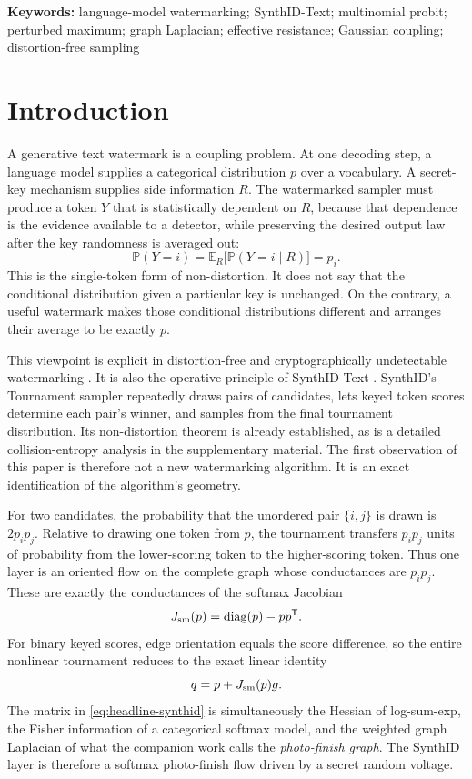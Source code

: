 \documentclass[11pt]{article}
\theoremstyle{definition}
\theoremstyle{remark}
\DeclareMathOperator{\diag}{diag}
\newcommand{\E}{\mathbb{E}}
\newcommand{\Pp}{\mathbb{P}}
\newcommand{\trans}{\mathsf{T}}
\begin{document}
\noindent\textbf{Keywords:} language-model watermarking; SynthID-Text; multinomial probit; perturbed maximum; graph Laplacian; effective resistance; Gaussian coupling; distortion-free sampling

\section{Introduction}

A generative text watermark is a coupling problem. At one decoding step, a language model supplies a categorical distribution $p$ over a vocabulary. A secret-key mechanism supplies side information $R$. The watermarked sampler must produce a token $Y$ that is statistically dependent on $R$, because that dependence is the evidence available to a detector, while preserving the desired output law after the key randomness is averaged out:
\begin{equation}
  \Pp(Y=i)=\E_R\big[\Pp(Y=i\mid R)\big]=p_i.
  \label{eq:nondist-intro}
\end{equation}
This is the single-token form of non-distortion. It does not say that the conditional distribution given a particular key is unchanged. On the contrary, a useful watermark makes those conditional distributions different and arranges their average to be exactly $p$.

This viewpoint is explicit in distortion-free and cryptographically undetectable watermarking \citep{kuditipudi2024robust,christ2024undetectable,hu2024unbiased,tsur2025couplings}. It is also the operative principle of SynthID-Text \citep{dathathri2024synthid}. SynthID's Tournament sampler repeatedly draws pairs of candidates, lets keyed token scores determine each pair's winner, and samples from the final tournament distribution. Its non-distortion theorem is already established, as is a detailed collision-entropy analysis in the supplementary material. The first observation of this paper is therefore not a new watermarking algorithm. It is an exact identification of the algorithm's geometry.

For two candidates, the probability that the unordered pair $\{i,j\}$ is drawn is $2p_i p_j$. Relative to drawing one token from $p$, the tournament transfers $p_i p_j$ units of probability from the lower-scoring token to the higher-scoring token. Thus one layer is an oriented flow on the complete graph whose conductances are $p_i p_j$. These are exactly the conductances of the softmax Jacobian
\[
J_{\rm sm}(p)=\diag(p)-pp^\trans.
\]
For binary keyed scores, edge orientation equals the score difference, so the entire nonlinear tournament reduces to the exact linear identity
\begin{equation}
q=p+J_{\rm sm}(p)g.
\label{eq:headline-synthid}
\end{equation}
The matrix in \eqref{eq:headline-synthid} is simultaneously the Hessian of log-sum-exp, the Fisher information of a categorical softmax model, and the weighted graph Laplacian of what the companion work calls the \emph{photo-finish graph}. The SynthID layer is therefore a softmax photo-finish flow driven by a secret random voltage.
\end{document}
